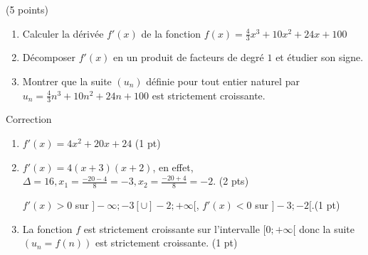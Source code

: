 \documentclass[a4paper,11pt]{article}
\theoremstyle{break}
\begin{document}
  
  \begin{exo}(5 points)
  ~
      \vspace{0.25cm}
      
 
 \begin{enumerate}
 
 \item  Calculer la dérivée $f'(x)$ de la fonction
 $f(x)=\frac{4}{3}x^3+10 x^2 + 24 x +100$  
 \item Décomposer $f'(x)$ en un produit de facteurs de degré $1$ et étudier son signe.  
 \item Montrer que la suite $(u_n)$ définie pour tout entier naturel par 
 $u_n=\frac{4}{3}n^3+10 n^2 + 24 n +100$ est strictement croissante. 
   
 \end{enumerate}

\begin{correction}

Correction
\begin{enumerate}
 \item $f'(x)=4 x^2+20 x+24$ (1 pt)
 \item $f'(x)=4(x+3)(x+2)$, en effet, $\Delta=16, x_1= \frac{-20-4}{8}=-3, x_2=\frac{-20+4}{8}=-2$. (2 pts)
 
 $f'(x)>0$ sur $]-\infty;-3[ \cup ]-2;+\infty[$, $f'(x)<0$ sur $]-3;-2[$.(1 pt)
 \item La fonction $f$ est strictement croissante sur l'intervalle $[0;+\infty[$ donc la suite $(u_n=f(n))$ 
 est strictement croissante. (1 pt)
\end{enumerate}


  
  
\end{correction}

  \end{exo}
  
   ~
  \vspace{0.5cm}
  
\end{document}
